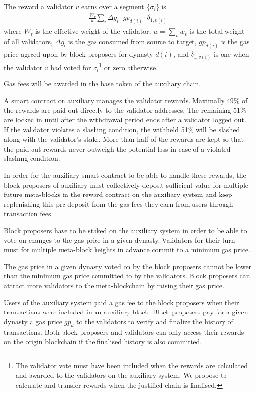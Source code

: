 \documentclass[12pt,a4paper]{article}
\begin{document}
The reward a validator $v$ earns over a segment $\{\sigma_i\}$ is
\begin{align}
    \frac{W_v}{w}\sum_{i} \Delta g_{i} \cdot gp_{d(i)} \cdot \delta_{1, v(i)}
\end{align}
where $W_v$ is the effective weight of the validator, $w = \sum_v w_v$ is the total weight of all validators, $\Delta g_{i}$ is the gas consumed from source to target, $gp_{d(i)}$ is the gas price agreed upon by block proposers for dynasty $d(i)$, and $\delta_{1, v(i)}$ is one when the validator $v$ had voted for $\sigma_i$\footnote{The validator vote must have been included when the rewards are calculated and awarded to the validators on the auxiliary system. We propose to calculate and transfer rewards when the justified chain is finalised.}
or zero otherwise.

Gas fees will be awarded in the base token of the auxiliary chain.

A smart contract on auxiliary manages the validator rewards.
Maximally 49\% of the rewards are paid out directly to the validator addresses.
The remaining 51\% are locked in until after the withdrawal period ends after a validator logged out.
If the validator violates a slashing condition, the withheld 51\% will be slashed along with the validator's stake.
More than half of the rewards are kept so that the paid out rewards never outweigh the potential loss in case of a violated slashing condition.

In order for the auxiliary smart contract to be able to handle these rewards, the block proposers of auxiliary must collectively deposit sufficient value for multiple future meta-blocks in the reward contract on the auxiliary system and keep replenishing this pre-deposit from the gas fees they earn from users through transaction fees.

Block proposers have to be staked on the auxiliary system in order to be able to vote on changes to the gas price in a given dynasty.
Validators for their turn must for multiple meta-block heights in advance commit to a minimum gas price.

The gas price in a given dynasty voted on by the block proposers cannot be lower than the minimum gas price committed to by the validators.
Block proposers can attract more validators to the meta-blockchain by raising their gas price.

Users of the auxiliary system paid a gas fee to the block proposers when their transactions were included in an auxiliary block.
Block proposers pay for a given dynasty a gas price $gp_d$ to the validators to verify and finalize the history of transactions.
Both block proposers and validators can only access their rewards on the origin blockchain if the finalised history is also committed.
\end{document}
